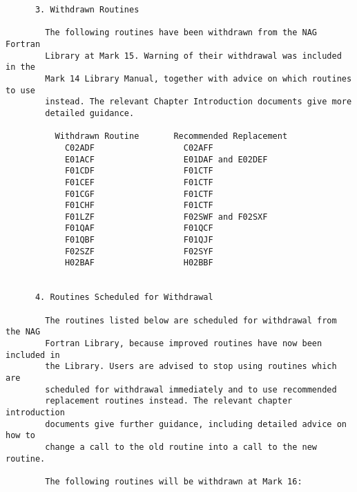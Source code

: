 \begin{small}
\begin{verbatim}
      3. Withdrawn Routines

        The following routines have been withdrawn from the NAG Fortran
        Library at Mark 15. Warning of their withdrawal was included in the
        Mark 14 Library Manual, together with advice on which routines to use
        instead. The relevant Chapter Introduction documents give more
        detailed guidance.

          Withdrawn Routine       Recommended Replacement
            C02ADF                  C02AFF
            E01ACF                  E01DAF and E02DEF
            F01CDF                  F01CTF
            F01CEF                  F01CTF
            F01CGF                  F01CTF
            F01CHF                  F01CTF
            F01LZF                  F02SWF and F02SXF
            F01QAF                  F01QCF
            F01QBF                  F01QJF
            F02SZF                  F02SYF
            H02BAF                  H02BBF


      4. Routines Scheduled for Withdrawal

        The routines listed below are scheduled for withdrawal from the NAG
        Fortran Library, because improved routines have now been included in
        the Library. Users are advised to stop using routines which are
        scheduled for withdrawal immediately and to use recommended
        replacement routines instead. The relevant chapter introduction
        documents give further guidance, including detailed advice on how to
        change a call to the old routine into a call to the new routine.

        The following routines will be withdrawn at Mark 16:


\end{verbatim}
\end{small}
